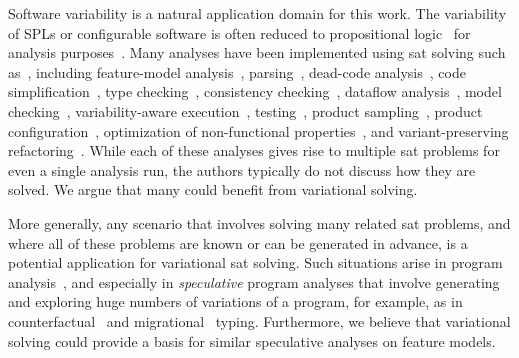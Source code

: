 %
Software variability is a natural application domain for this work. The
variability of SPLs or configurable software is often reduced to propositional
logic~\citep{B05,CW07,MWCC08} for analysis
purposes~\citep{BSRC10,TAK+:CSUR14,GBT+19}. Many analyses have been implemented
using \ac{sat} solving such as~\cite{TAK+:CSUR14}, including feature-model
analysis~\citep{BSRC10,GBT+19}, parsing~\citep{KGR+:OOPSLA11}, dead-code
analysis~\citep{TLSS:EuroSys11}, code simplification~\citep{RGA+:ICSE15}, type
checking~\citep{TBKC07}, consistency checking~\citep{CP06}, dataflow
analysis~\citep{LKA+:ESECFSE13}, model checking~\citep{CCS+13},
variability-aware execution~\citep{NKN:ICSE14}, testing~\citep{MMCA:IST14},
product sampling~\citep{MKR+:ICSE16,VAT+:SPLC18}, product
configuration~\citep{SIMA:ASE13}, optimization of non-functional
properties~\citep{SRK+:SQJ12}, and variant-preserving
refactoring~\citep{FMS+:SANER17}. While each of these analyses gives rise to
multiple \ac{sat} problems for even a single analysis run, the authors typically
do not discuss how they are solved. We argue that many could benefit from
variational solving.

More generally, any scenario that involves solving many related \ac{sat}
problems, and where all of these problems are known or can be generated in
advance, is a potential application for variational \ac{sat} solving.
%
Such situations arise in program analysis~\citep{VGD:FSE12}, and especially in
\emph{speculative} program analyses that involve generating and exploring huge
numbers of variations of a program, for example, as in
counterfactual~\citep{CE14popl} and migrational~\citep{CCW18icfp,CCEW18popl}
typing. Furthermore, we believe that variational solving could provide a basis
for similar speculative analyses on feature models.


